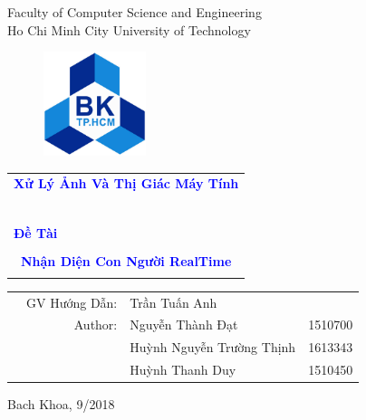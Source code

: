 \documentclass[a4paper]{article}
\begin{document}
\begin{titlepage}
\begin{center}
Faculty of Computer Science and Engineering\\
Ho Chi Minh City University of Technology
\end{center}

\vspace{.51cm}

\begin{figure}[h!]
\begin{center}
\includegraphics[width=3cm]{LogoBK.jpg}
\end{center}
\end{figure}

\vspace{0.5cm}


\begin{center}
\begin{tabular}{c}
\multicolumn{1}{l}{\textbf{{\Large \textcolor{blue}{Xử Lý Ảnh Và Thị Giác Máy Tính}}}}\\
~~\\
\hline
\\
\multicolumn{1}{l}{\textbf{{\Large \textcolor{blue}{Đề Tài}}}}\\
\\
\textbf{{\Huge \textcolor{blue}{Nhận Diện Con Người RealTime}}}\\
\\
\hline
\end{tabular}
\end{center}

\vspace{3cm}

\begin{table}[h]
\begin{tabular}{rrll}
\hspace{5 cm} & GV Hướng Dẫn: & Trần Tuấn Anh &\\
& Author: & Nguyễn Thành Đạt & 1510700 \\
& & Huỳnh Nguyễn Trường Thịnh & 1613343 \\ 
& & Huỳnh Thanh Duy& 1510450\\ 
\end{tabular}
\end{table}

\begin{center}
{\footnotesize Bach Khoa, 9/2018}
\end{center}
\end{titlepage}
\end{document}
